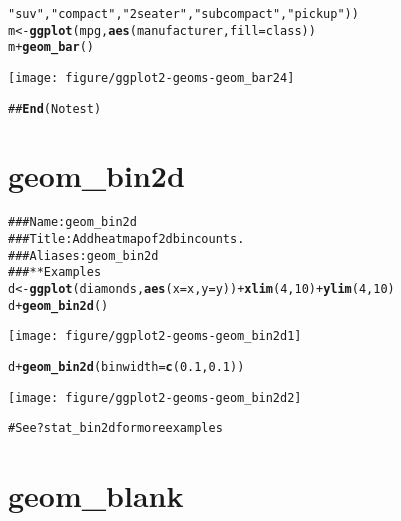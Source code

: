 \documentclass[a4paper,titlepage]{tufte-handout}\usepackage{graphicx, color}
\makeatletter
\def\maxwidth{ %
  \ifdim\Gin@nat@width>\linewidth
    \linewidth
  \else
    \Gin@nat@width
  \fi
}
\newcommand{\hlfunctioncall}[1]{\textcolor[rgb]{0.501960784313725,0,0.329411764705882}{\textbf{#1}}}%
\newcommand{\hlstring}[1]{\textcolor[rgb]{0.6,0.6,1}{#1}}%
\newcommand{\hlcomment}[1]{\textcolor[rgb]{0.180392156862745,0.6,0.341176470588235}{#1}}%
\newenvironment{kframe}{%
 \def\at@end@of@kframe{}%
 \ifinner\ifhmode%
  \def\at@end@of@kframe{\end{minipage}}%
  \begin{minipage}{\columnwidth}%
 \fi\fi%
 \def\FrameCommand##1{\hskip\@totalleftmargin \hskip-\fboxsep
 \colorbox{shadecolor}{##1}\hskip-\fboxsep
     \hskip-\linewidth \hskip-\@totalleftmargin \hskip\columnwidth}%
 \MakeFramed {\advance\hsize-\width
   \@totalleftmargin\z@ \linewidth\hsize
   \@setminipage}}%
 {\par\unskip\endMakeFramed%
 \at@end@of@kframe}
\newenvironment{knitrout}{}{} %
\makeatother
\begin{document}
\begin{knitrout}
\begin{kframe}
\begin{alltt}
\hlstring{"suv"}, \hlstring{"compact"}, \hlstring{"2seater"}, \hlstring{"subcompact"}, \hlstring{"pickup"}))
m <- \hlfunctioncall{ggplot}(mpg, \hlfunctioncall{aes}(manufacturer, fill=class))
m + \hlfunctioncall{geom_bar}()
\end{alltt}
\end{kframe}\texttt{[image: figure/ggplot2-geoms-geom\_bar24]} \begin{kframe}\begin{alltt}
\hlcomment{## \hlfunctioncall{End}(No test)}
\end{alltt}
\end{kframe}
\end{knitrout}


\section{geom\_bin2d}

\begin{knitrout}
\color{fgcolor}\begin{kframe}
\begin{alltt}
\hlcomment{### Name: geom_bin2d}
\hlcomment{### Title: Add heatmap of 2d bin counts.}
\hlcomment{### Aliases: geom_bin2d}
\hlcomment{### ** Examples}
d <- \hlfunctioncall{ggplot}(diamonds, \hlfunctioncall{aes}(x = x, y = y)) + \hlfunctioncall{xlim}(4,10) + \hlfunctioncall{ylim}(4,10)
d + \hlfunctioncall{geom_bin2d}()
\end{alltt}
\end{kframe}\texttt{[image: figure/ggplot2-geoms-geom\_bin2d1]} \begin{kframe}\begin{alltt}
d + \hlfunctioncall{geom_bin2d}(binwidth = \hlfunctioncall{c}(0.1, 0.1))
\end{alltt}
\end{kframe}\texttt{[image: figure/ggplot2-geoms-geom\_bin2d2]} \begin{kframe}\begin{alltt}
\hlcomment{# See ?stat_bin2d for more examples}
\end{alltt}
\end{kframe}
\end{knitrout}


\section{geom\_blank}
\end{document}
